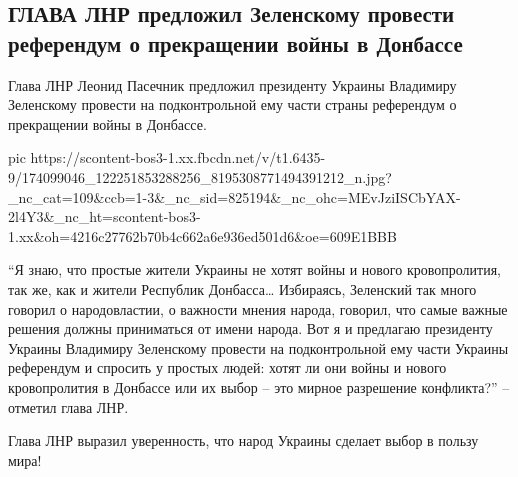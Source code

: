  
 
 
 
 

\subsection{ГЛАВА ЛНР предложил Зеленскому провести референдум о прекращении войны в Донбассе}
\label{sec:14_04_2021.fb.respublikalnr.6.referendum_vojna_donbass}

Глава ЛНР Леонид Пасечник предложил президенту Украины Владимиру Зеленскому
провести на подконтрольной ему части страны референдум о прекращении войны в
Донбассе.


\ifcmt
  pic https://scontent-bos3-1.xx.fbcdn.net/v/t1.6435-9/174099046_122251853288256_8195308771494391212_n.jpg?_nc_cat=109&ccb=1-3&_nc_sid=825194&_nc_ohc=MEvJziISCbYAX-2l4Y3&_nc_ht=scontent-bos3-1.xx&oh=4216c27762b70b4c662a6e936ed501d6&oe=609E1BBB
\fi


\enquote{Я знаю, что простые жители Украины не хотят войны и нового кровопролития, так
же, как и жители Республик Донбасса… Избираясь, Зеленский так много говорил о
народовластии, о важности мнения народа, говорил, что самые важные решения
должны приниматься от имени народа. Вот я и предлагаю президенту Украины
Владимиру Зеленскому провести на подконтрольной ему части Украины референдум и
спросить у простых людей: хотят ли они войны и нового кровопролития в Донбассе
или их выбор – это мирное разрешение конфликта?} – отметил глава ЛНР.  

Глава ЛНР выразил уверенность, что народ Украины сделает выбор в пользу мира!
